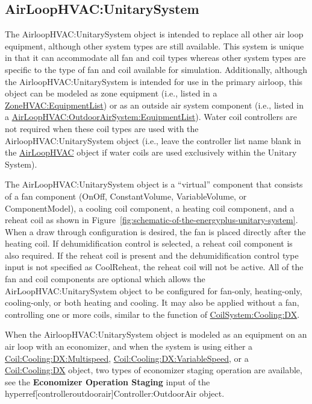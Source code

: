 \subsection{AirLoopHVAC:UnitarySystem}\label{airloophvacunitarysystem}

The AirloopHVAC:UnitarySystem object is intended to replace all other air loop equipment, although other system types are still available. This system is unique in that it can accommodate all fan and coil types whereas other system types are specific to the type of fan and coil available for simulation. Additionally, although the AirloopHVAC:UnitarySystem is intended for use in the primary airloop, this object can be modeled as zone equipment (i.e., listed in a \hyperref[zonehvacequipmentlist]{ZoneHVAC:EquipmentList}) or as an outside air system component (i.e., listed in a \hyperref[airloophvacoutdoorairsystemequipmentlist]{AirLoopHVAC:OutdoorAirSystem:EquipmentList}). Water coil controllers are not required when these coil types are used with the AirloopHVAC:UnitarySystem object (i.e., leave the controller list name blank in the \hyperref[airloophvac]{AirLoopHVAC} object if water coils are used exclusively within the Unitary System).

The AirLoopHVAC:UnitarySystem object is a ``virtual'' component that consists of a fan component (OnOff, ConstantVolume, VariableVolume, or ComponentModel), a cooling coil component, a heating coil component, and a reheat coil as shown in Figure~\ref{fig:schematic-of-the-energyplus-unitary-system}. When a draw through configuration is desired, the fan is placed directly after the heating coil. If dehumidification control is selected, a reheat coil component is also required. If the reheat coil is present and the dehumidification control type input is not specified as CoolReheat, the reheat coil will not be active. All of the fan and coil components are optional which allows the AirLoopHVAC:UnitarySystem object to be configured for fan-only, heating-only, cooling-only, or both heating and cooling. It may also be applied without a fan, controlling one or more coils, similar to the function of \hyperref[coilsystemcoolingdx]{CoilSystem:Cooling:DX}.

When the AirloopHVAC:UnitarySystem object is modeled as an equipment on an air loop with an economizer, and when the system is using either a \hyperref[coilcoolingdxmultispeed]{Coil:Cooling:DX:Multispeed}, \hyperref[coilcoolingdxvariablespeed]{Coil:Cooling:DX:VariableSpeed}, or a \hyperref[coilcoolingdx]{Coil:Cooling:DX} object, two types of economizer staging operation are available, see the \textbf{Economizer Operation Staging} input of the hyperref[controlleroutdoorair]{Controller:OutdoorAir} object.

